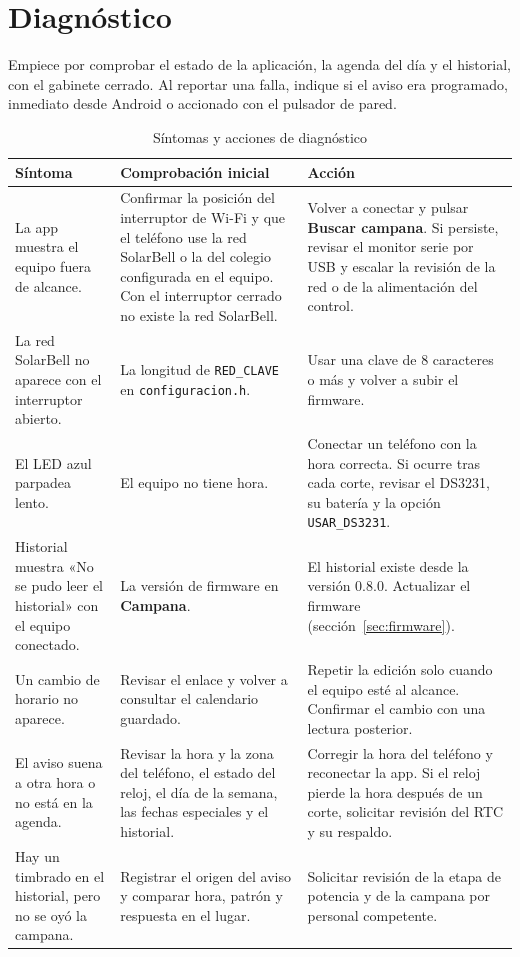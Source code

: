 \documentclass[a4paper,11pt]{article}
\newcommand{\pin}[1]{\texttt{#1}}
\begin{document}
\clearpage
\section{Diagnóstico}
\label{sec:diagnostico}
Empiece por comprobar el estado de la aplicación, la agenda del día y el historial, con el gabinete cerrado. Al reportar una falla, indique si el aviso era programado, inmediato desde Android o accionado con el pulsador de pared.

\begin{table}[H]
\centering\small
\caption{Síntomas y acciones de diagnóstico}
\begin{tabularx}{\linewidth}{@{}P{3.44cm}YY@{}}
\toprule
\textbf{Síntoma} & \textbf{Comprobación inicial} & \textbf{Acción} \\
\midrule
La app muestra el equipo fuera de alcance. & Confirmar la posición del interruptor de Wi-Fi y que el teléfono use la red SolarBell o la del colegio configurada en el equipo. Con el interruptor cerrado no existe la red SolarBell. & Volver a conectar y pulsar \textbf{Buscar campana}. Si persiste, revisar el monitor serie por USB y escalar la revisión de la red o de la alimentación del control. \\
La red SolarBell no aparece con el interruptor abierto. & La longitud de \pin{RED\_CLAVE} en \pin{configuracion.h}. & Usar una clave de 8 caracteres o más y volver a subir el firmware. \\
El LED azul parpadea lento. & El equipo no tiene hora. & Conectar un teléfono con la hora correcta. Si ocurre tras cada corte, revisar el DS3231, su batería y la opción \pin{USAR\_DS3231}. \\
Historial muestra «No se pudo leer el historial» con el equipo conectado. & La versión de firmware en \textbf{Campana}. & El historial existe desde la versión 0.8.0. Actualizar el firmware (sección~\ref{sec:firmware}). \\
Un cambio de horario no aparece. & Revisar el enlace y volver a consultar el calendario guardado. & Repetir la edición solo cuando el equipo esté al alcance. Confirmar el cambio con una lectura posterior. \\
El aviso suena a otra hora o no está en la agenda. & Revisar la hora y la zona del teléfono, el estado del reloj, el día de la semana, las fechas especiales y el historial. & Corregir la hora del teléfono y reconectar la app. Si el reloj pierde la hora después de un corte, solicitar revisión del RTC y su respaldo. \\
Hay un timbrado en el historial, pero no se oyó la campana. & Registrar el origen del aviso y comparar hora, patrón y respuesta en el lugar. & Solicitar revisión de la etapa de potencia y de la campana por personal competente. \\

\end{tabularx}
\end{table}
\end{document}
